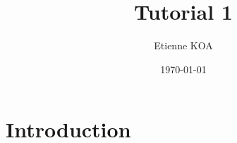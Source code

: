 \documentclass{article}
\title{Tutorial 1}
\author{Etienne KOA}
\date{\today}  %
\begin{document}
\maketitle  %


\section{Introduction}\label{sec:introduction}
\end{document}
